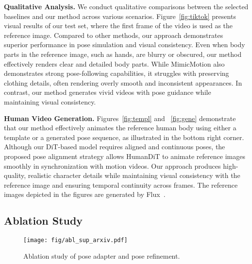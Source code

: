 \noindent\textbf{Qualitative Analysis.} We conduct qualitative comparisons between the selected baselines and our method across various scenarios. Figure~\ref{fig:tiktok} presents visual results of our test set, where the first frame of the video is used as the reference image. Compared to other methods, our approach demonstrates superior performance in pose simulation and visual consistency. Even when body parts in the reference image, such as hands, are blurry or obscured, our method effectively renders clear and detailed body parts. While MimicMotion also demonstrates strong pose-following capabilities, it struggles with preserving clothing details, often rendering overly smooth and inconsistent appearances. In contrast, our method generates vivid videos with pose guidance while maintaining visual consistency.



\noindent\textbf{Human Video Generation.} Figures~\ref{fig:templ} and ~\ref{fig:gene} demonstrate that our method effectively animates the reference human body using either a template or a generated pose sequence, as illustrated in the bottom right corner. Although our DiT-based model requires aligned and continuous poses, the proposed pose alignment strategy allows HumanDiT to animate reference images smoothly in synchronization with motion videos. Our approach produces high-quality, realistic character details while maintaining visual consistency with the reference image and ensuring temporal continuity across frames. The reference images depicted in the figures are generated by Flux~\cite{flux}. %



\subsection{Ablation Study}

\begin{figure}[htp]
    \centering
    \texttt{[image: fig/abl\_sup\_arxiv.pdf]}
    \vspace{-0.25in}
    \caption{Ablation study of pose adapter and pose refinement.}
    \vspace{-0.15in}
    \label{fig:abl}
\end{figure}

